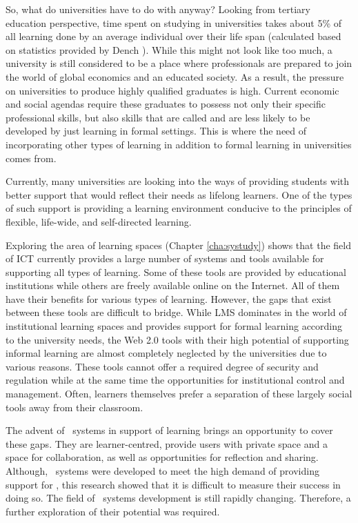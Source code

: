 So, what do universities have to do with \LLLs anyway? Looking from tertiary
education perspective, time spent on studying in universities takes about 5\% of
all learning done by an average individual over their life span (calculated
based on statistics provided by Dench \citeyearpar[pp.~28-37]{Dench2010}). While
this might not look like too much, a university is still considered to be a
place where professionals are prepared to join the world of global economics
and an educated society. As a result, the pressure on universities to produce
highly qualified graduates is high. Current economic and social agendas require
these graduates to possess not only their specific professional skills, but also
skills that are called \LLLs and are less likely to be developed by just
learning in formal settings. This is where the need of incorporating other types
of learning in addition to formal learning in universities comes from.

Currently, many universities are looking into the ways of providing students
with better support that would reflect their needs as lifelong learners. One of
the types of such support is providing a learning environment conducive to the
principles of flexible, life-wide, and self-directed learning.


Exploring the area of learning spaces (Chapter \ref{cha:systudy}) shows that
the field of ICT currently provides a large number of systems and tools
available for supporting all types of learning. Some of these tools are provided
by educational institutions while others are freely available online on the
Internet. All of them have their benefits for various types of learning.
However, the gaps that exist between these tools are difficult to bridge. While
LMS dominates in the world of institutional learning spaces and provides support
for formal learning according to the university needs, the Web 2.0 tools with
their high potential of supporting informal learning are almost completely
neglected by the universities due to various reasons. These tools cannot offer a
required degree of security and regulation while at the same time the
opportunities for institutional control and management. Often, learners
themselves prefer a separation of these largely social tools away from their
classroom.

The advent of \ep~systems in support of learning brings an opportunity to cover
these gaps. They are learner-centred, provide users with private space and a
space for collaboration, as well as opportunities for reflection and sharing.
Although, \ep~systems were developed to meet the high demand of providing
support for \LLLsn, this research showed that it is difficult to measure their
success in doing so. The field of \ep~systems development is still rapidly
changing. Therefore, a further exploration of their potential was required.

